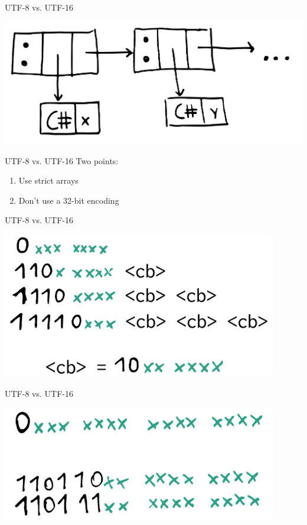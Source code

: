 \documentclass[20pt]{beamer}
\begin{document}
\begin{frame}{UTF-8 vs. UTF-16}
    \begin{center}
    \includegraphics[width=\textwidth]{images/string.pdf}
    \end{center}
\end{frame}

\begin{frame}{UTF-8 vs. UTF-16}
    Two points: \\
    \begin{enumerate}
    \item Use strict arrays
    \item Don't use a 32-bit encoding
    \end{enumerate}
\end{frame}

\begin{frame}{UTF-8 vs. UTF-16}
    \begin{center}
    \includegraphics[width=0.9\textwidth]{images/utf8.pdf}
    \end{center}
\end{frame}

\begin{frame}{UTF-8 vs. UTF-16}
    \begin{center}
    \includegraphics[width=0.9\textwidth]{images/utf16.pdf}
    \end{center}
\end{frame}
\end{document}
